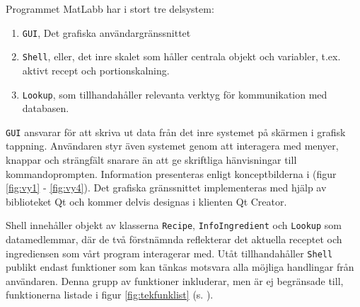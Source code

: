 Programmet MatLabb har i stort tre delsystem:

\begin{enumerate}
\item \verb+GUI+, Det grafiska användargränssnittet
\item \verb+Shell+, eller, det inre skalet som håller centrala objekt och variabler, t.ex. aktivt recept och portionskalning.
\item \verb+Lookup+, som tillhandahåller relevanta verktyg för kommunikation med databasen.
\end{enumerate}
\verb+GUI+ ansvarar för att skriva ut data från det inre systemet på skärmen i grafisk tappning. Användaren styr även systemet genom att interagera med menyer, knappar och strängfält snarare än att ge skriftliga hänvisningar till kommandoprompten. Information presenteras enligt konceptbilderna i (figur \ref{fig:vy1} - \ref{fig:vy4}). Det grafiska gränssnittet implementeras med hjälp av biblioteket Qt och kommer delvis designas i klienten Qt Creator.

Shell innehåller objekt av klasserna \verb+Recipe+, \verb+InfoIngredient+ och \verb+Lookup+ som datamedlemmar, där de två förstnämnda reflekterar det aktuella receptet och ingrediensen som vårt program interagerar med. Utåt tillhandahåller \verb+Shell+ publikt endast funktioner som kan tänkas motsvara alla möjliga handlingar från användaren. Denna grupp av funktioner inkluderar, men är ej begränsade till, funktionerna listade i figur \ref{fig:tekfunklist} (s. \pageref{fig:tekfunklist}).

